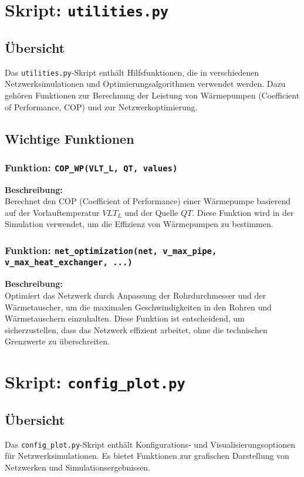 \section{Skript: \texttt{utilities.py}}

\subsection{Übersicht}
Das \texttt{utilities.py}-Skript enthält Hilfsfunktionen, die in verschiedenen Netzwerksimulationen und Optimierungsalgorithmen verwendet werden. Dazu gehören Funktionen zur Berechnung der Leistung von Wärmepumpen (Coefficient of Performance, COP) und zur Netzwerkoptimierung.

\subsection{Wichtige Funktionen}

\subsubsection{Funktion: \texttt{COP\_WP(VLT\_L, QT, values)}}
\textbf{Beschreibung:}\\
Berechnet den COP (Coefficient of Performance) einer Wärmepumpe basierend auf der Vorlauftemperatur \(VLT_L\) und der Quelle \(QT\). Diese Funktion wird in der Simulation verwendet, um die Effizienz von Wärmepumpen zu bestimmen.

\subsubsection{Funktion: \texttt{net\_optimization(net, v\_max\_pipe, v\_max\_heat\_exchanger, ...)}}
\textbf{Beschreibung:}\\
Optimiert das Netzwerk durch Anpassung der Rohrdurchmesser und der Wärmetauscher, um die maximalen Geschwindigkeiten in den Rohren und Wärmetauschern einzuhalten. Diese Funktion ist entscheidend, um sicherzustellen, dass das Netzwerk effizient arbeitet, ohne die technischen Grenzwerte zu überschreiten.

\section{Skript: \texttt{config\_plot.py}}

\subsection{Übersicht}
Das \texttt{config\_plot.py}-Skript enthält Konfigurations- und Visualisierungsoptionen für Netzwerksimulationen. Es bietet Funktionen zur grafischen Darstellung von Netzwerken und Simulationsergebnissen.

